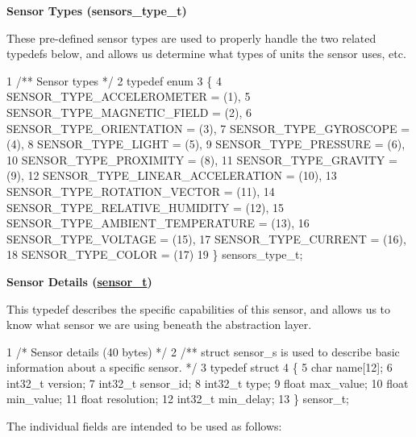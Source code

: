 {\bfseries Sensor Types (sensors\+\_\+type\+\_\+t)}

These pre-\/defined sensor types are used to properly handle the two related typedefs below, and allows us determine what types of units the sensor uses, etc.


\begin{DoxyCode}
1 /** Sensor types */
2 typedef enum
3 \{
4   SENSOR\_TYPE\_ACCELEROMETER         = (1),
5   SENSOR\_TYPE\_MAGNETIC\_FIELD        = (2),
6   SENSOR\_TYPE\_ORIENTATION           = (3),
7   SENSOR\_TYPE\_GYROSCOPE             = (4),
8   SENSOR\_TYPE\_LIGHT                 = (5),
9   SENSOR\_TYPE\_PRESSURE              = (6),
10   SENSOR\_TYPE\_PROXIMITY             = (8),
11   SENSOR\_TYPE\_GRAVITY               = (9),
12   SENSOR\_TYPE\_LINEAR\_ACCELERATION   = (10),
13   SENSOR\_TYPE\_ROTATION\_VECTOR       = (11),
14   SENSOR\_TYPE\_RELATIVE\_HUMIDITY     = (12),
15   SENSOR\_TYPE\_AMBIENT\_TEMPERATURE   = (13),
16   SENSOR\_TYPE\_VOLTAGE               = (15),
17   SENSOR\_TYPE\_CURRENT               = (16),
18   SENSOR\_TYPE\_COLOR                 = (17)
19 \} sensors\_type\_t;
\end{DoxyCode}


{\bfseries Sensor Details (\hyperlink{_adafruit___sensor_8h_structsensor__t}{sensor\+\_\+t})}

This typedef describes the specific capabilities of this sensor, and allows us to know what sensor we are using beneath the abstraction layer.


\begin{DoxyCode}
1 /* Sensor details (40 bytes) */
2 /** struct sensor\_s is used to describe basic information about a specific sensor. */
3 typedef struct
4 \{
5     char     name[12];
6     int32\_t  version;
7     int32\_t  sensor\_id;
8     int32\_t  type;
9     float    max\_value;
10     float    min\_value;
11     float    resolution;
12     int32\_t  min\_delay;
13 \} sensor\_t;
\end{DoxyCode}


The individual fields are intended to be used as follows\+:


